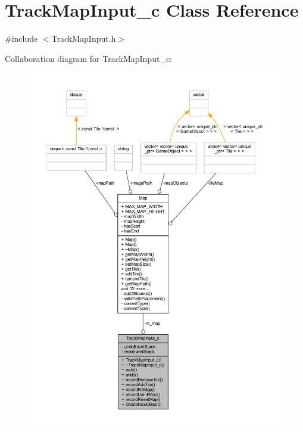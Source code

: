 \hypertarget{class_track_map_input__c}{\section{Track\+Map\+Input\+\_\+c Class Reference}
\label{class_track_map_input__c}
}


{\ttfamily \#include $<$Track\+Map\+Input.\+h$>$}



Collaboration diagram for Track\+Map\+Input\+\_\+c\+:\nopagebreak
\begin{figure}[H]
\begin{center}
\leavevmode
\includegraphics[width=350pt]{class_track_map_input__c__coll__graph}
\end{center}
\end{figure}

